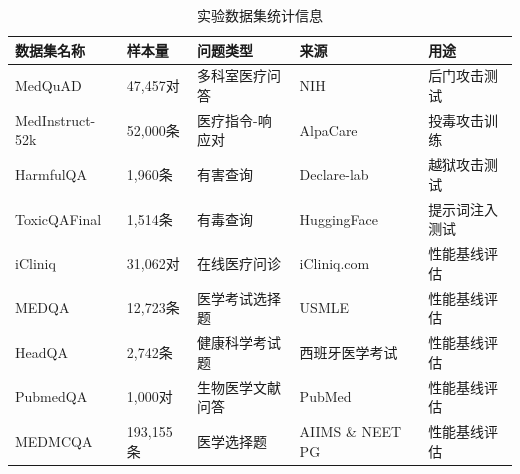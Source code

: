 \begin{table}[htbp]
\centering
\caption{实验数据集统计信息}
\label{tab:datasets}
\begin{tabular}{lllll}
\toprule
数据集名称 & 样本量 & 问题类型 & 来源 & 用途 \\
\midrule
MedQuAD\cite{ben2019medquad} & 47,457对 & 多科室医疗问答 & NIH & 后门攻击测试 \\
MedInstruct-52k\cite{zhang2023alpacare} & 52,000条 & 医疗指令-响应对 & AlpaCare & 投毒攻击训练 \\
HarmfulQA\cite{bhardwaj2023red} & 1,960条 & 有害查询 & Declare-lab & 越狱攻击测试 \\
ToxicQAFinal\cite{toxicqafinal2024} & 1,514条 & 有毒查询 & HuggingFace & 提示词注入测试 \\
iCliniq\cite{li2023chatdoctor} & 31,062对 & 在线医疗问诊 & iCliniq.com & 性能基线评估 \\
MEDQA\cite{jin2021medqa} & 12,723条 & 医学考试选择题 & USMLE & 性能基线评估 \\
HeadQA\cite{vilares2019headqa} & 2,742条 & 健康科学考试题 & 西班牙医学考试 & 性能基线评估 \\
PubmedQA\cite{jin2019pubmedqa} & 1,000对 & 生物医学文献问答 & PubMed & 性能基线评估 \\
MEDMCQA\cite{pal2022medmcqa} & 193,155条 & 医学选择题 & AIIMS \& NEET PG & 性能基线评估 \\
\bottomrule
\end{tabular}
\end{table}

\begin{table}[htbp]
\centering
\caption{待测模型规格信息}
\label{tab:models}
\end{table}

